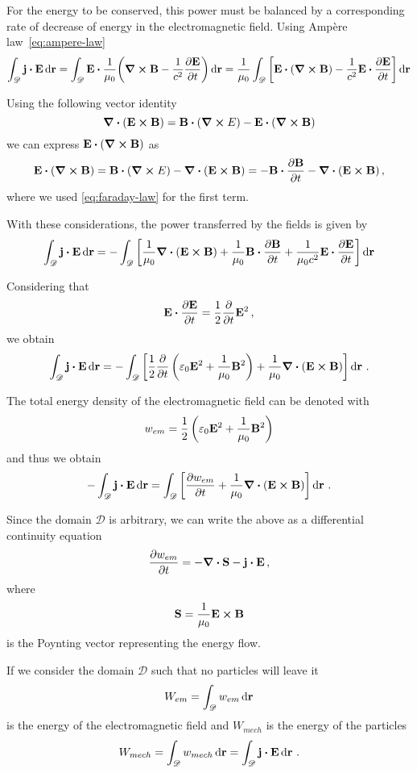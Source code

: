 \documentclass[12pt, class=report, crop=false]{standalone}
\begin{document}
For the energy to be conserved, this power must be balanced by a corresponding
rate of decrease of energy in the electromagnetic field.
Using Ampère law~\eqref{eq:ampere-law}
\[
  \int_{\mathscr{D}} \vb{j} \vdot \vb{E} \dd{\vb{r}} =
  \int_{\mathscr{D}} \vb{E} \vdot \frac{1}{\mu_0} \qty(\curl{\vb{B}} - \frac{1}{c^2} \pdv{\vb{E}}{t}) \dd{\vb{r}} =
  \frac{1}{\mu_0} \int_{\mathscr{D}} \left[\vb{E} \vdot(\curl{\vb{B}}) -
    \frac{1}{c^2} \vb{E} \vdot \pdv{\vb{E}}{t} \right] \dd{\vb{r}}
\]

Using the following vector identity
\[
  \div(\vb{E} \cp \vb{B}) = \vb{B} \vdot (\curl{E}) - \vb{E} \vdot (\curl{\vb{B}})
\]
we can express \(\vb{E} \vdot(\curl{\vb{B}})\) as
\[
  \vb{E} \vdot(\curl{\vb{B}}) = \vb{B} \vdot (\curl{E}) - \div(\vb{E} \cp \vb{B}) =
  - \vb{B} \vdot \pdv{\vb{B}}{t} - \div(\vb{E} \cp \vb{B})\,,
\]
where we used \cref{eq:faraday-law} for the first term.

With these considerations, the power transferred by the fields is given by
\[
  \int_{\mathscr{D}} \vb{j} \vdot \vb{E} \dd{\vb{r}} =
  -\int_{\mathscr{D}} \left[\frac{1}{\mu_0} \div(\vb{E} \cp \vb{B}) + \frac{1}{\mu_0} \vb{B} \vdot \pdv{\vb{B}}{t} +
    \frac{1}{\mu_0 c^2} \vb{E} \vdot \pdv{\vb{E}}{t} \right] \dd{\vb{r}}
\]

Considering that
\[
  \vb{E} \vdot \pdv{\vb{E}}{t} = \frac{1}{2} \pdv{t} \vb{E}^2\,,
\]
we obtain
\[
  \int_{\mathscr{D}} \vb{j} \vdot \vb{E} \dd{\vb{r}} =
  -\int_{\mathscr{D}} \left[ \frac{1}{2} \pdv{t}
    \left( \varepsilon_0 \vb{E}^2 + \frac{1}{\mu_0}\vb{B}^2 \right)
  + \frac{1}{\mu_0}\div(\vb{E} \cp \vb{B}) \right] \dd{\vb{r}}\,.
\]

The total energy density of the electromagnetic field can be denoted with
\[
  w_{em} = \frac{1}{2} \left( \varepsilon_0 \vb{E}^2 + \frac{1}{\mu_0}\vb{B}^2 \right)
\]
and thus we obtain
\[
  -\int_{\mathscr{D}} \vb{j} \vdot \vb{E} \dd{\vb{r}} =
  \int_{\mathscr{D}} \left[ \pdv{w_{em}}{t} +
  \frac{1}{\mu_0}\div(\vb{E} \cp \vb{B}) \right] \dd{\vb{r}}\,.
\]

Since the domain \(\mathscr{D}\) is arbitrary, we can write the above as a
differential continuity equation
\begin{equation}
  \label{eq:poynting-theorem-local}
  \pdv{w_{em}}{t} = - \div{\vb{S}} - \vb{j} \vdot \vb{E}\,,
\end{equation}
where
\[
  \vb{S} = \frac{1}{\mu_0} \vb{E} \cp \vb{B}
\]
is the Poynting vector representing the energy flow.

If we consider the domain \(\mathscr{D}\) such that no particles will leave it
\[
  W_{em} = \int_{\mathscr{D}} w_{em} \dd{\vb{r}}
\]
is the energy of the electromagnetic field and \(W_{mech}\) is the
energy of the particles
\[
  W_{mech} = \int_{\mathscr{D}} w_{mech} \dd{\vb{r}} =
  \int_{\mathscr{D}} \vb{j} \vdot \vb{E} \dd{\vb{r}}\,.
\]
\end{document}
